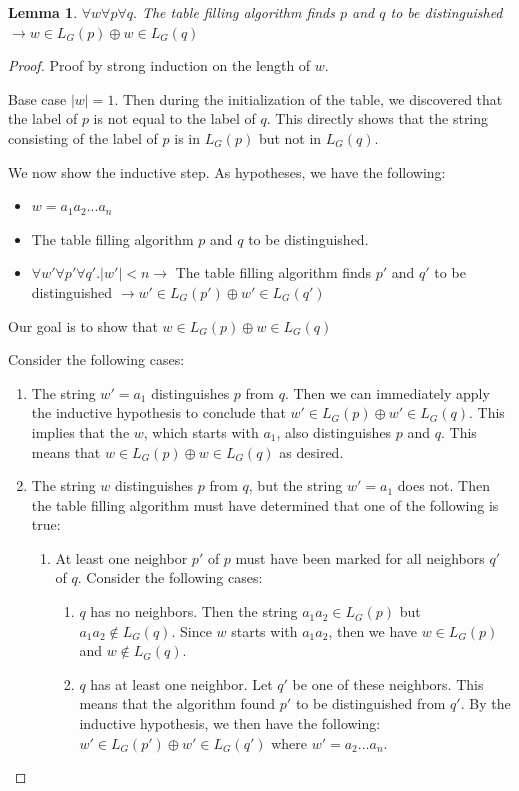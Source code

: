 \documentclass[12pt]{article}
\newtheorem{lemma}{Lemma}
\begin{document}
\begin{lemma}
\label{thm:tbl_correctness2}
$\forall w \forall p \forall q.$ The table filling algorithm finds $p$ and $q$ to be distinguished $\rightarrow w \in L_G(p) \oplus w \in L_G(q)$
\end{lemma}
\begin{proof}
Proof by strong induction on the length of $w$.

Base case $|w|=1$. Then during the initialization of the table, we discovered that
the label of $p$ is not equal to the label of $q$. This directly shows that the string consisting
of the label of $p$ is in $L_G(p)$ but not in $L_G(q)$.

We now show the inductive step. As hypotheses, we have the following:

\begin{itemize}
    \item $w=a_1 a_2 ... a_n$
    \item The table filling algorithm $p$ and $q$ to be distinguished.
    \item $\forall w' \forall p' \forall q' . |w'| < n \rightarrow$ The table filling algorithm finds $p'$ and $q'$ to be distinguished $\rightarrow w' \in L_G(p') \oplus w' \in L_G(q')$
\end{itemize}

Our goal is to show that $w \in L_G(p) \oplus w \in L_G(q)$

Consider the following cases:
\begin{enumerate}
    \item The string $w'=a_1$ distinguishes $p$ from $q$. Then we can immediately
    apply the inductive hypothesis to conclude that $w' \in L_G(p) \oplus w' \in L_G(q)$.
    This implies that the $w$, which starts with $a_1$, also distinguishes $p$ and $q$.
    This means that $w \in L_G(p) \oplus w \in L_G(q)$ as desired.
    \item The string $w$ distinguishes $p$ from $q$, but the string $w'=a_1$ does not.
    Then the table filling algorithm must have determined that one of the following is true:
    \begin{enumerate}
        \item At least one neighbor $p'$ of $p$ must have been marked for
        all neighbors $q'$ of $q$. Consider the following cases:
        \begin{enumerate}
            \item $q$ has no neighbors. Then the string $a_1 a_2 \in L_G(p)$ but $a_1 a_2 \notin L_G(q)$.
            Since $w$ starts with $a_1 a_2$, then we have $w \in L_G(p)$ and $w \notin L_G(q)$.
            \item $q$ has at least one neighbor. Let $q'$ be one of these neighbors.
            This means that the algorithm found $p'$ to be distinguished from $q'$.
            By the inductive hypothesis, we then have the following:
            $w' \in L_G(p') \oplus w' \in L_G(q')$ where $w'=a_2 ... a_n$.


\end{enumerate}
\end{enumerate}
\end{enumerate}
\end{proof}
\end{document}
